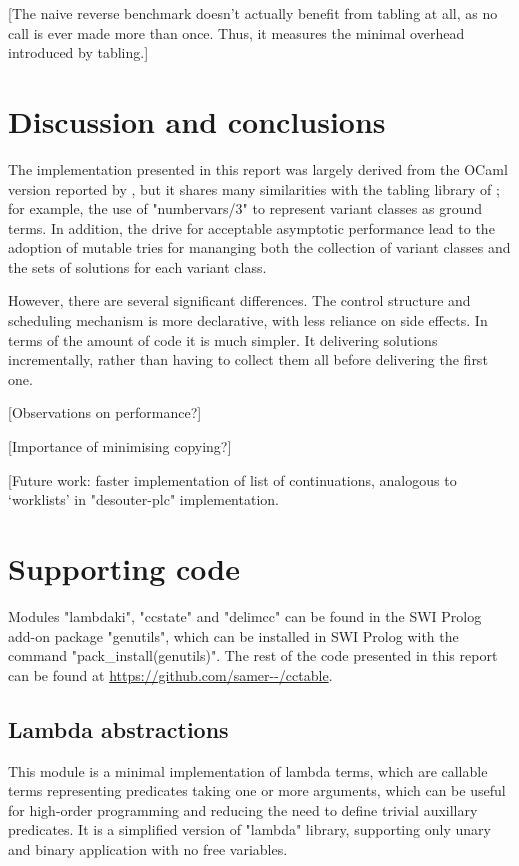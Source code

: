 [The naive reverse benchmark doesn't actually benefit from tabling at all, as no call is
ever made more than once. Thus, it measures the minimal overhead introduced by tabling.]


\section{Discussion and conclusions}

The implementation presented in this report was largely derived from the OCaml
version reported by \cite{Abdallah2017a}, but it shares many similarities with
the tabling library of \cite{DesouterVan-DoorenSchrijvers2015}; for example,
the use of "numbervars/3" to represent variant classes as ground terms. In
addition, the drive for acceptable asymptotic performance lead to the adoption
of mutable tries for mananging both the collection of variant classes and the sets
of solutions for each variant class.

However, there are several significant differences.
The control structure and scheduling mechanism is more declarative, with less
reliance on side effects. In terms of the amount of code it is much simpler.
It delivering solutions incrementally, rather than having to collect them all before 
delivering the first one.

[Observations on performance?]

[Importance of minimising copying?]

[Future work: faster implementation of list of continuations, analogous to `worklists' in
"desouter-plc" implementation.

\appendix
\section{Supporting code}

Modules "lambdaki", "ccstate" and "delimcc" can be found in the SWI Prolog
add-on package "genutils", which can be installed in SWI Prolog with the command
"pack_install(genutils)". The rest of the code presented in this report can be
found at \url{https://github.com/samer--/cctable}.

\subsection{Lambda abstractions}
\label{sec:lambdaki}

This module is a minimal implementation of lambda terms, which are callable terms representing
predicates taking one or more arguments, which can be useful for high-order programming and
reducing the need to define trivial auxillary predicates. It is a simplified version of 
 "lambda" library,
supporting only unary and binary application with no free variables.

